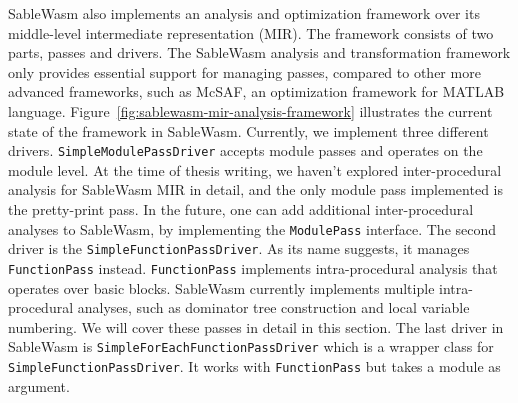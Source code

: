 SableWasm also implements an analysis and optimization framework over its
middle-level intermediate representation (MIR). The framework consists of two
parts, passes and drivers. The SableWasm analysis and transformation framework
only provides essential support for managing passes, compared to other more
advanced frameworks, such as McSAF\cite{mcsaf}, an optimization framework for
MATLAB language. Figure~\ref{fig:sablewasm-mir-analysis-framework} illustrates
the current state of the framework in SableWasm. Currently, we implement three
different drivers. \texttt{SimpleModulePassDriver} accepts module passes and
operates on the module level. At the time of thesis writing, we haven't explored
inter-procedural analysis for SableWasm MIR in detail, and the only module pass
implemented is the pretty-print pass. In the future, one can add additional
inter-procedural analyses to SableWasm, by implementing the \texttt{ModulePass}
interface. The second driver is the \texttt{SimpleFunctionPassDriver}. As its
name suggests, it manages \texttt{FunctionPass} instead. \texttt{FunctionPass}
implements intra-procedural analysis that operates over basic blocks. SableWasm
currently implements multiple intra-procedural analyses, such as dominator tree
construction and local variable numbering. We will cover these passes in detail
in this section. The last driver in SableWasm is
\texttt{SimpleForEachFunctionPassDriver} which is a wrapper class for
\texttt{SimpleFunctionPassDriver}. It works with \texttt{FunctionPass} but takes
a module as argument.




%